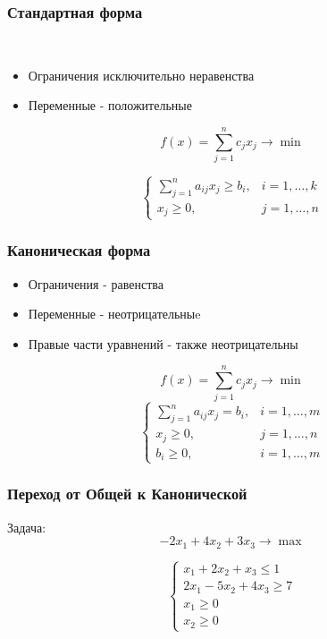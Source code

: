 \documentclass[12pt]{beamer}
\begin{document}
	\begin{frame}
	\frametitle{Стандартная форма}
	\
	\begin{itemize}
		\item Ограничения исключительно неравенства
		\item Переменные - положительные
	\end{itemize}
	
\begin{equation*}
	f(x)=\sum_{j=1}^n c_j x_j \to \min
\end{equation*}

\begin{equation*}
	\begin{cases}	
		\sum_{j=1}^n a_{ij} x_j \geq b_i, &  i=1,\dots, k\\
		x_j\geq0, & j=1,\dots,n
	\end{cases}
\end{equation*}
\end{frame}
	\begin{frame}
	\frametitle{Каноническая форма}
	\begin{itemize}
		\item Ограничения - равенства
		\item Переменные - неотрицательныe
		\item Правые части уравнений - также неотрицательны
	\end{itemize}
\begin{equation*}
	f(x)=\sum_{j=1}^n c_j x_j \to \min
\end{equation*}
\begin{equation*}
	\begin{cases}	
		\sum_{j=1}^n a_{ij} x_j= b_i, &i=1,\dots,m\\
		x_j\geq0, & j=1,\dots,n\\
		b_i\geq0, & i=1,\dots,m
	\end{cases}
\end{equation*}
\end{frame}
\begin{frame}
\frametitle{Переход от Общей к Канонической}
Задача: 
\begin{equation*}
	-2x_1+4x_2+3x_3 \to \max
\end{equation*}

\begin{equation*}
	\begin{cases}	
		x_1+2x_2+x_3\leq 1\\
		2x_1-5x_2+4x_3\geq 7\\
		x_1\geq0\\
		x_2\geq0
	\end{cases}
\end{equation*}
\end{frame}
\end{document}
